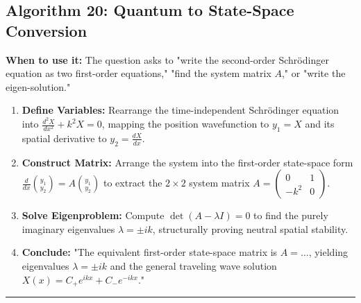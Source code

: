 \documentclass[11pt, a4paper]{report}
\begin{document}
\subsection*{Algorithm 20: Quantum to State-Space Conversion}
\textbf{When to use it:} The question asks to "write the second-order Schrödinger equation as two first-order equations," "find the system matrix $A$," or "write the eigen-solution."
\begin{enumerate}[label=\textbf{\arabic*.}]
    \item \textbf{Define Variables:} Rearrange the time-independent Schrödinger equation into $\frac{d^2X}{dx^2} + k^2X = 0$, mapping the position wavefunction to $y_1 = X$ and its spatial derivative to $y_2 = \frac{dX}{dx}$.
    \item \textbf{Construct Matrix:} Arrange the system into the first-order state-space form $\frac{d}{dx}\binom{y_1}{y_2} = A\binom{y_1}{y_2}$ to extract the $2 \times 2$ system matrix $A = \begin{pmatrix} 0 & 1 \\ -k^2 & 0 \end{pmatrix}$.
    \item \textbf{Solve Eigenproblem:} Compute $\det(A - \lambda I) = 0$ to find the purely imaginary eigenvalues $\lambda = \pm ik$, structurally proving neutral spatial stability.
    \item \textbf{Conclude:} "The equivalent first-order state-space matrix is $A = \dots$, yielding eigenvalues $\lambda = \pm ik$ and the general traveling wave solution $X(x) = C_+ e^{ikx} + C_- e^{-ikx}$."
\end{enumerate}
\vspace{1em}
\noindent\rule{\textwidth}{0.4pt}
\vspace{1em}
\end{document}
